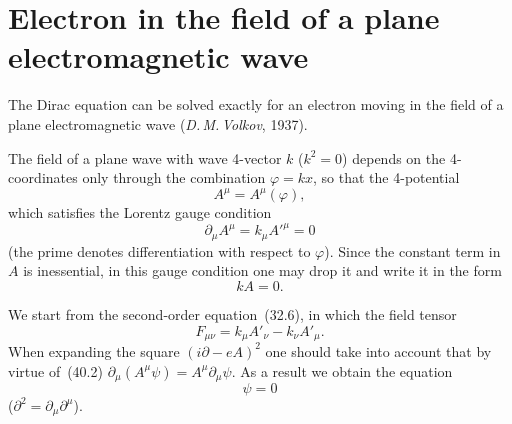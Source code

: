 \section{Electron in the field of a plane electromagnetic wave}

The Dirac equation can be solved exactly for an electron moving in the field of a plane electromagnetic wave (\textit{D.\,M.\,Volkov}, 1937).

The field of a plane wave with wave 4-vector $k$ ($k^2 = 0$) depends on the 4-coordinates only through the combination $\varphi = kx$, so that the 4-potential
\begin{equation}
A^\mu = A^\mu(\varphi),
\tag{40.1}
\end{equation}
which satisfies the Lorentz gauge condition
\begin{equation}
\partial_\mu A^\mu = k_\mu A'^\mu = 0
\tag{40.2}
\end{equation}
(the prime denotes differentiation with respect to $\varphi$). Since the constant term in $A$ is inessential, in this gauge condition one may drop it and write it in the form
\[
kA = 0.
\]

We start from the second-order equation~(32.6), in which the field tensor
\begin{equation}
F_{\mu\nu} = k_\mu A'_\nu - k_\nu A'_\mu.
\tag{40.3}
\end{equation}
When expanding the square $(i\partial - eA)^2$ one should take into account that by virtue of~(40.2) $\partial_\mu(A^\mu\psi) = A^\mu\partial_\mu\psi$. As a result we obtain the equation
\begin{equation}
[-\partial^2 - 2ie(A\partial) + e^2A^2 - m^2 - ie(\gamma k)(\gamma A')]\psi = 0
\tag{40.4}
\end{equation}
($\partial^2 = \partial_\mu\partial^\mu$).

